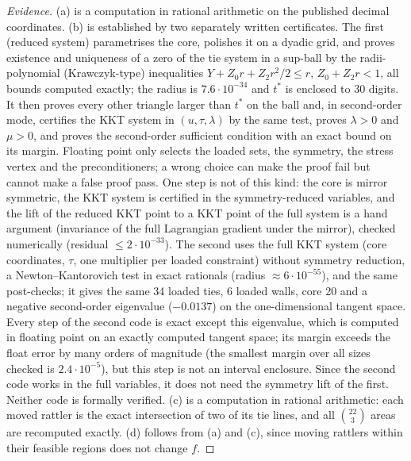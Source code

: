 \documentclass[11pt]{amsart}
\theoremstyle{definition}
\begin{document}
\begin{proof}[Evidence]
(a) is a computation in rational arithmetic on the published decimal coordinates. (b) is established by two separately written certificates.
The first (reduced system) parametrises the core, polishes it on a dyadic grid, and proves existence and uniqueness of a zero of the tie system in a sup-ball by the radii-polynomial (Krawczyk-type) inequalities $Y + Z_0 r + Z_2r^2/2 \le r$, $Z_0 + Z_2 r < 1$, all bounds computed exactly; the radius is $7.6\cdot10^{-34}$ and $t^*$ is enclosed to 30 digits. It then proves every other triangle larger than $t^*$ on the ball and, in second-order mode, certifies the KKT system in $(u, \tau, \lambda)$ by the same test, proves $\lambda > 0$ and $\mu > 0$, and proves the second-order sufficient condition with an exact bound on its margin. Floating point only selects the loaded sets, the symmetry, the stress vertex and the preconditioners; a wrong choice can make the proof fail but cannot make a false proof pass. One step is not of this kind: the core is mirror symmetric, the KKT system is certified in the symmetry-reduced variables, and the lift of the reduced KKT point to a KKT point of the full system is a hand argument (invariance of the full Lagrangian gradient under the mirror), checked numerically (residual $\le 2\cdot10^{-33}$). %
The second uses the full KKT system (core coordinates, $\tau$, one multiplier per loaded constraint) without symmetry reduction, a Newton--Kantorovich test in exact rationals (radius $\approx 6\cdot10^{-55}$), and the same post-checks; it gives the same 34 loaded ties, 6 loaded walls, core 20 and a negative second-order eigenvalue ($-0.0137$) on the one-dimensional tangent space. Every step of the second code is exact except this eigenvalue, which is computed in floating point on an exactly computed tangent space; its margin exceeds the float error by many orders of magnitude (the smallest margin over all sizes checked is $2.4\cdot10^{-5}$), but this step is not an interval enclosure. Since the second code works in the full variables, it does not need the symmetry lift of the first. %
Neither code is formally verified. (c) is a computation in rational arithmetic: each moved rattler is the exact intersection of two of its tie lines, and all $\binom{22}{3}$ areas are recomputed exactly. (d) follows from (a) and (c), since moving rattlers within their feasible regions does not change $f$.
\end{proof}
\end{document}
